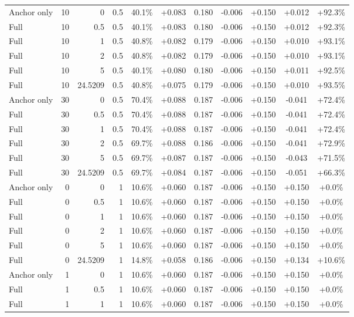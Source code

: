 \begin{table}[htbp]
\begin{tabular}{lrrrccccccc}
Anchor only & 10 & 0 & 0.5 & 40.1\% & +0.083 & 0.180 & -0.006 & +0.150 & +0.012 & +92.3\% \\
Full & 10 & 0.5 & 0.5 & 40.1\% & +0.083 & 0.180 & -0.006 & +0.150 & +0.012 & +92.3\% \\
Full & 10 & 1 & 0.5 & 40.8\% & +0.082 & 0.179 & -0.006 & +0.150 & +0.010 & +93.1\% \\
Full & 10 & 2 & 0.5 & 40.8\% & +0.082 & 0.179 & -0.006 & +0.150 & +0.010 & +93.1\% \\
Full & 10 & 5 & 0.5 & 40.1\% & +0.080 & 0.180 & -0.006 & +0.150 & +0.011 & +92.5\% \\
Full & 10 & 24.5209 & 0.5 & 40.8\% & +0.075 & 0.179 & -0.006 & +0.150 & +0.010 & +93.5\% \\
Anchor only & 30 & 0 & 0.5 & 70.4\% & +0.088 & 0.187 & -0.006 & +0.150 & -0.041 & +72.4\% \\
Full & 30 & 0.5 & 0.5 & 70.4\% & +0.088 & 0.187 & -0.006 & +0.150 & -0.041 & +72.4\% \\
Full & 30 & 1 & 0.5 & 70.4\% & +0.088 & 0.187 & -0.006 & +0.150 & -0.041 & +72.4\% \\
Full & 30 & 2 & 0.5 & 69.7\% & +0.088 & 0.186 & -0.006 & +0.150 & -0.041 & +72.9\% \\
Full & 30 & 5 & 0.5 & 69.7\% & +0.087 & 0.187 & -0.006 & +0.150 & -0.043 & +71.5\% \\
Full & 30 & 24.5209 & 0.5 & 69.7\% & +0.084 & 0.187 & -0.006 & +0.150 & -0.051 & +66.3\% \\
Anchor only & 0 & 0 & 1 & 10.6\% & +0.060 & 0.187 & -0.006 & +0.150 & +0.150 & +0.0\% \\
Full & 0 & 0.5 & 1 & 10.6\% & +0.060 & 0.187 & -0.006 & +0.150 & +0.150 & +0.0\% \\
Full & 0 & 1 & 1 & 10.6\% & +0.060 & 0.187 & -0.006 & +0.150 & +0.150 & +0.0\% \\
Full & 0 & 2 & 1 & 10.6\% & +0.060 & 0.187 & -0.006 & +0.150 & +0.150 & +0.0\% \\
Full & 0 & 5 & 1 & 10.6\% & +0.060 & 0.187 & -0.006 & +0.150 & +0.150 & +0.0\% \\
Full & 0 & 24.5209 & 1 & 14.8\% & +0.058 & 0.186 & -0.006 & +0.150 & +0.134 & +10.6\% \\
Anchor only & 1 & 0 & 1 & 10.6\% & +0.060 & 0.187 & -0.006 & +0.150 & +0.150 & +0.0\% \\
Full & 1 & 0.5 & 1 & 10.6\% & +0.060 & 0.187 & -0.006 & +0.150 & +0.150 & +0.0\% \\
Full & 1 & 1 & 1 & 10.6\% & +0.060 & 0.187 & -0.006 & +0.150 & +0.150 & +0.0\% \\

\end{tabular}
\end{table}

